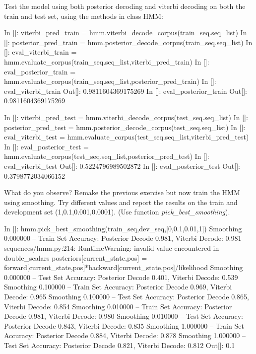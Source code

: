 \begin{exercise}
Test the model using both posterior decoding and viterbi decoding on
both the train and test set, using the methods in class HMM:
\begin{python}
In []: viterbi_pred_train = hmm.viterbi_decode_corpus(train_seq.seq_list)
In []: posterior_pred_train = hmm.posterior_decode_corpus(train_seq.seq_list)
In []: eval_viterbi_train =   hmm.evaluate_corpus(train_seq.seq_list,viterbi_pred_train)
In []: eval_posterior_train = hmm.evaluate_corpus(train_seq.seq_list,posterior_pred_train)
In []: eval_viterbi_train
Out[]: 0.9811604369175269
In []: eval_posterior_train
Out[]: 0.9811604369175269

In []: viterbi_pred_test = hmm.viterbi_decode_corpus(test_seq.seq_list)
In []: posterior_pred_test = hmm.posterior_decode_corpus(test_seq.seq_list)
In []: eval_viterbi_test =   hmm.evaluate_corpus(test_seq.seq_list,viterbi_pred_test)
In []: eval_posterior_test = hmm.evaluate_corpus(test_seq.seq_list,posterior_pred_test)
In []: eval_viterbi_test
Out[]: 0.5224796989502872
In []: eval_posterior_test
Out[]: 0.3798772034066152


\end{python}

What do you observe? Remake the previous exercise but now train the HMM
using smoothing. Try different values and report the results on the
train and development set (1,0.1,0.001,0.0001). (Use function
\emph{pick\_best\_smoothing}).


\begin{python}
In []: hmm.pick_best_smoothing(train_seq,dev_seq,[0,0.1,0.01,1])
Smoothing 0.000000 --  Train Set Accuracy: Posterior Decode 0.981, Viterbi Decode: 0.981
sequences/hmm.py:214: RuntimeWarning: invalid value encountered in double_scalars
  posteriors[current_state,pos] = forward[current_state,pos]*backward[current_state,pos]/likelihood
Smoothing 0.000000 -- Test Set Accuracy: Posterior Decode 0.401, Viterbi Decode: 0.539
Smoothing 0.100000 --  Train Set Accuracy: Posterior Decode 0.969, Viterbi Decode: 0.965
Smoothing 0.100000 -- Test Set Accuracy: Posterior Decode 0.865, Viterbi Decode: 0.854
Smoothing 0.010000 --  Train Set Accuracy: Posterior Decode 0.981, Viterbi Decode: 0.980
Smoothing 0.010000 -- Test Set Accuracy: Posterior Decode 0.843, Viterbi Decode: 0.835
Smoothing 1.000000 --  Train Set Accuracy: Posterior Decode 0.884, Viterbi Decode: 0.878
Smoothing 1.000000 -- Test Set Accuracy: Posterior Decode 0.821, Viterbi Decode: 0.812
Out[]: 0.1
\end{python}


\end{exercise}
